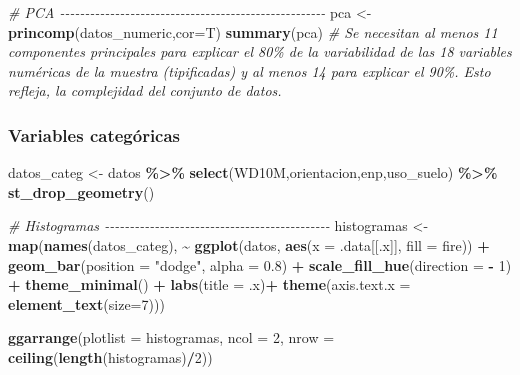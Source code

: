 \documentclass[12pt,a4paper,]{book}
\newenvironment{Shaded}{\begin{snugshade}}{\end{snugshade}}
\newcommand{\AttributeTok}[1]{\textcolor[rgb]{0.13,0.29,0.53}{#1}}
\newcommand{\CommentTok}[1]{\textcolor[rgb]{0.56,0.35,0.01}{\textit{#1}}}
\newcommand{\DecValTok}[1]{\textcolor[rgb]{0.00,0.00,0.81}{#1}}
\newcommand{\FloatTok}[1]{\textcolor[rgb]{0.00,0.00,0.81}{#1}}
\newcommand{\FunctionTok}[1]{\textcolor[rgb]{0.13,0.29,0.53}{\textbf{#1}}}
\newcommand{\NormalTok}[1]{#1}
\newcommand{\OtherTok}[1]{\textcolor[rgb]{0.56,0.35,0.01}{#1}}
\newcommand{\SpecialCharTok}[1]{\textcolor[rgb]{0.81,0.36,0.00}{\textbf{#1}}}
\newcommand{\StringTok}[1]{\textcolor[rgb]{0.31,0.60,0.02}{#1}}
\numberwithin{dummy}{section}
\theoremstyle{ocrenumbox}
\theoremstyle{blacknumex}
\theoremstyle{blacknumbox}
\theoremstyle{ocrenum}
\theoremstyle{ocrenum}
\begin{document}
\begin{Shaded}
\begin{Highlighting}[]
\CommentTok{\# PCA {-}{-}{-}{-}{-}{-}{-}{-}{-}{-}{-}{-}{-}{-}{-}{-}{-}{-}{-}{-}{-}{-}{-}{-}{-}{-}{-}{-}{-}{-}{-}{-}{-}{-}{-}{-}{-}{-}{-}{-}{-}{-}{-}{-}{-}{-}{-}{-}{-}{-}{-}{-}{-}}
\NormalTok{pca }\OtherTok{\textless{}{-}} \FunctionTok{princomp}\NormalTok{(datos\_numeric,}\AttributeTok{cor=}\NormalTok{T)}
\FunctionTok{summary}\NormalTok{(pca) }
\CommentTok{\# Se necesitan al menos 11 componentes principales para explicar el 80\% de la variabilidad de las 18 variables numéricas de la muestra (tipificadas) y al menos 14 para explicar el 90\%. Esto refleja, la complejidad del conjunto de datos.}
\end{Highlighting}
\end{Shaded}

\hypertarget{variables-categuxf3ricas}{%
\subsubsection*{Variables categóricas}\label{variables-categuxf3ricas}}

\begin{Shaded}
\begin{Highlighting}[]
\NormalTok{datos\_categ }\OtherTok{\textless{}{-}}\NormalTok{ datos }\SpecialCharTok{\%\textgreater{}\%}  
  \FunctionTok{select}\NormalTok{(WD10M,orientacion,enp,uso\_suelo) }\SpecialCharTok{\%\textgreater{}\%} 
  \FunctionTok{st\_drop\_geometry}\NormalTok{()}

\CommentTok{\# Histogramas {-}{-}{-}{-}{-}{-}{-}{-}{-}{-}{-}{-}{-}{-}{-}{-}{-}{-}{-}{-}{-}{-}{-}{-}{-}{-}{-}{-}{-}{-}{-}{-}{-}{-}{-}{-}{-}{-}{-}{-}{-}{-}{-}{-}{-}}
\NormalTok{histogramas }\OtherTok{\textless{}{-}} \FunctionTok{map}\NormalTok{(}\FunctionTok{names}\NormalTok{(datos\_categ), }
                   \SpecialCharTok{\textasciitilde{}} \FunctionTok{ggplot}\NormalTok{(datos, }\FunctionTok{aes}\NormalTok{(}\AttributeTok{x =}\NormalTok{ .data[[.x]], }
                                       \AttributeTok{fill =}\NormalTok{ fire)) }\SpecialCharTok{+}
                    \FunctionTok{geom\_bar}\NormalTok{(}\AttributeTok{position =} \StringTok{"dodge"}\NormalTok{, }\AttributeTok{alpha =} \FloatTok{0.8}\NormalTok{) }\SpecialCharTok{+}
                    \FunctionTok{scale\_fill\_hue}\NormalTok{(}\AttributeTok{direction =} \SpecialCharTok{{-}} \DecValTok{1}\NormalTok{) }\SpecialCharTok{+}
                    \FunctionTok{theme\_minimal}\NormalTok{() }\SpecialCharTok{+}
                    \FunctionTok{labs}\NormalTok{(}\AttributeTok{title =}\NormalTok{ .x)}\SpecialCharTok{+}
                    \FunctionTok{theme}\NormalTok{(}\AttributeTok{axis.text.x =} \FunctionTok{element\_text}\NormalTok{(}\AttributeTok{size=}\DecValTok{7}\NormalTok{)))}

\FunctionTok{ggarrange}\NormalTok{(}\AttributeTok{plotlist =}\NormalTok{ histogramas, }\AttributeTok{ncol =} \DecValTok{2}\NormalTok{, }\AttributeTok{nrow =} \FunctionTok{ceiling}\NormalTok{(}\FunctionTok{length}\NormalTok{(histogramas)}\SpecialCharTok{/}\DecValTok{2}\NormalTok{))}
\end{Highlighting}
\end{Shaded}
\end{document}
